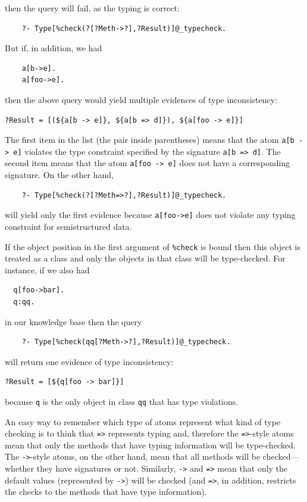 \documentclass[11pt]{article}
\begin{document}
then the query will fail, as the typing is correct:
\begin{verbatim}
    ?- Type[%check(?[?Meth->?],?Result)]@_typecheck.
\end{verbatim}
But if, in addition, we had
\begin{verbatim}
    a[b->e].
    a[foo->e].
\end{verbatim}
then the above query would yield multiple evidences of type inconsistency:
\begin{verbatim}
?Result = [(${a[b -> e]}, ${a[b => d]}), ${a[foo -> e]}]
\end{verbatim}
The first item in the list (the pair inside parentheses)
means that the atom {\tt a[b -> e]} violates the type constraint
specified by the signature {\tt a[b => d]}. The second item means that the
atom {\tt a[foo -> e]} does not have a corresponding signature.
On the other hand,
\begin{verbatim}
    ?- Type[%check(?[?Meth=>?],?Result)]@_typecheck.
\end{verbatim}
will yield only the first evidence because {\tt a[foo->e]} does not violate
any typing constraint for semistructured data.

If the object position in the first argument of {\tt \%check} is bound
then this object is treated as a class and only the objects in that class
will be type-checked. For instance, if we also had
\begin{verbatim}
  q[foo->bar].
  q:qq.
\end{verbatim}
in our knowledge base then the query
\begin{verbatim}
    ?- Type[%check(qq[?Meth->?],?Result)]@_typecheck.
\end{verbatim}
will return one evidence of type inconsistency:
\begin{verbatim}
?Result = [${q[foo -> bar]}]
\end{verbatim}
because {\tt q} is the only object in class {\tt qq} that has type
violations.  

An easy way to remember which type of atoms represent what kind of type
checking is to think that {\tt =>}  represents typing and, therefore the
{\tt =>}-style atoms mean that only the methods that have typing
information will be type-checked. The {\tt ->}-style atoms, on the other
hand, mean that all methods will be checked---whether they have signatures
or not. Similarly, {\tt *->} and {\tt *=>} mean that only the default
values (represented by {\tt *->}) will be checked (and {\tt *=>}, in
addition, restricts the checks to the methods that have type information).      
\end{document}
